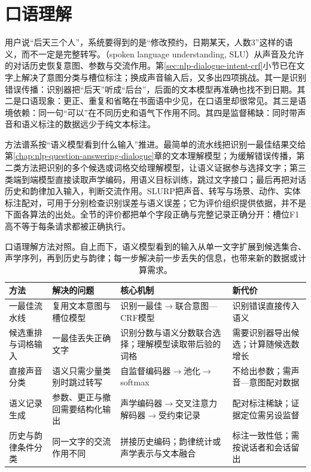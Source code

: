 \section{口语理解}
\label{sec:nlp-speech-understanding}

用户说“后天三个人”，系统要得到的是“修改预约，日期某天，人数3”这样的语义，而不一定是完整转写。（spoken language understanding, SLU）从声音及允许的对话历史恢复意图、参数与交流作用。第\ref{sec:nlp-dialogue-intent-crf}小节已在文字上解决了意图分类与槽位标注；换成声音输入后，又多出四项挑战。其一是识别错误传播：识别器把“后天”听成“后台”，后面的文本模型再准确也找不到日期。其二是口语现象：更正、重复和省略在书面语中少见，在口语里却很常见。其三是语境依赖：同一句“可以”在不同历史和语气下作用不同。其四是监督稀缺：同时带声音和语义标注的数据远少于纯文本标注。

方法谱系按“语义模型看到什么输入”推进。最简单的流水线把识别一最佳结果交给第\ref{chap:nlp-question-answering-dialogue}章的文本理解模型；为缓解错误传播，第二类方法把识别的多个候选或词格交给理解模型，让语义证据参与选择文字；第三类端到端模型直接读取声学编码，用语义目标训练，跳过文字接口；最后再把对话历史和韵律加入输入，判断交流作用。SLURP把声音、转写与场景、动作、实体标注配对，可用于分别检查识别误差与语义误差；它为评价组织提供依据，并不是下面各算法的出处。全节的评价都把单个字段正确与完整记录正确分开：槽位F1高不等于每条请求都被正确执行。

\begin{table}[htbp]
  \centering
  \begin{tabularx}{\linewidth}{@{}>{\raggedright\arraybackslash}p{28mm}>{\raggedright\arraybackslash}X>{\raggedright\arraybackslash}X>{\raggedright\arraybackslash}X@{}}
    \toprule
    方法 & 解决的问题 & 核心机制 & 新代价\\
    \midrule
    一最佳流水线 & 复用文本意图与槽位模型 & 识别一最佳$\to$联合意图—CRF模型 & 识别错误直接传入语义\\
    候选重排与词格输入 & 一最佳丢失正确文字 & 识别分数与语义分数联合选择；理解模型读取带后验的词格 & 需要识别器导出候选；计算随候选数增长\\
    直接声音分类 & 语义只需少量类别时跳过转写 & 自监督编码器$\to$池化$\to$softmax & 不给出参数；需声音—意图配对数据\\
    语义记录生成 & 参数、更正与撤回需要结构化输出 & 声学编码器$\to$交叉注意力解码器$\to$受约束记录 & 配对标注稀缺；证据定位需另设监督\\
    历史与韵律条件分类 & 同一文字的交流作用不同 & 拼接历史编码；韵律统计或声学表示与文本融合 & 标注一致性低；需按说话者和会话留出\\
    \bottomrule
  \end{tabularx}
  \caption{口语理解方法对照。自上而下，语义模型看到的输入从单一文字扩展到候选集合、声学序列，再到历史与韵律；每一步解决前一步丢失的信息，也带来新的数据或计算需求。}
  \label{tab:nlp-speech-slu-methods}
\end{table}
\FloatBarrier

